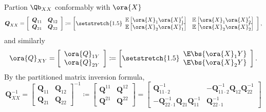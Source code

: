 Partion $\Qb_{XX}$ conformably with $\ora{X}$
\begin{equation}
    \notag 
    \boldsymbol{Q}_{X X}=\left[\begin{array}{ll}
    \boldsymbol{Q}_{11} & \boldsymbol{Q}_{12} \\
    \boldsymbol{Q}_{21} & \boldsymbol{Q}_{22}
    \end{array}\right]\coloneqq\left[{\setstretch{1.5}\begin{array}{cc}
    \mathbb{E}\left[\ora{X}_1 \ora{X}_1^{\prime}\right] & \mathbb{E}\left[\ora{X}_1 \ora{X}_2^{\prime}\right] \\
    \mathbb{E}\left[\ora{X}_2 \ora{X}_1^{\prime}\right] & \mathbb{E}\left[\ora{X}_2 \ora{X}_2^{\prime}\right]
    \end{array}}\right],
\end{equation}  
and similarly 
\begin{equation}
    \notag 
    \ora{Q}_{XY} = \left[\begin{array}{c}
        \ora{Q}_{1Y} \\
        \ora{Q}_{2Y}
    \end{array}\right] \coloneqq \left[{\setstretch{1.5}\begin{array}{c}
        \E\bs{\ora{X}_1 Y} \\
        \E\bs{\ora{X}_2 Y}
    \end{array}}\right].
\end{equation}
By the partitioned matrix inversion formula, 
\begin{equation}
    \label{hansen_eq_2_43}
    \boldsymbol{Q}_{X X}^{-1}=\left[\begin{array}{ll}
    \boldsymbol{Q}_{11} & \boldsymbol{Q}_{12} \\
    \boldsymbol{Q}_{21} & \boldsymbol{Q}_{22}
    \end{array}\right]^{-1} \coloneqq \left[\begin{array}{ll}
    \boldsymbol{Q}^{11} & \boldsymbol{Q}^{12} \\
    \boldsymbol{Q}^{21} & \boldsymbol{Q}^{22}
    \end{array}\right]=\left[\begin{array}{cc}
    \boldsymbol{Q}_{11 \cdot 2}^{-1} & -\boldsymbol{Q}_{11 \cdot 2}^{-1} \boldsymbol{Q}_{12} \boldsymbol{Q}_{22}^{-1} \\
    -\boldsymbol{Q}_{22 \cdot 1}^{-1} \mathbf{Q}_{21} \boldsymbol{Q}_{11}^{-1} & \boldsymbol{Q}_{22 \cdot 1}^{-1}
    \end{array}\right]
\end{equation}

